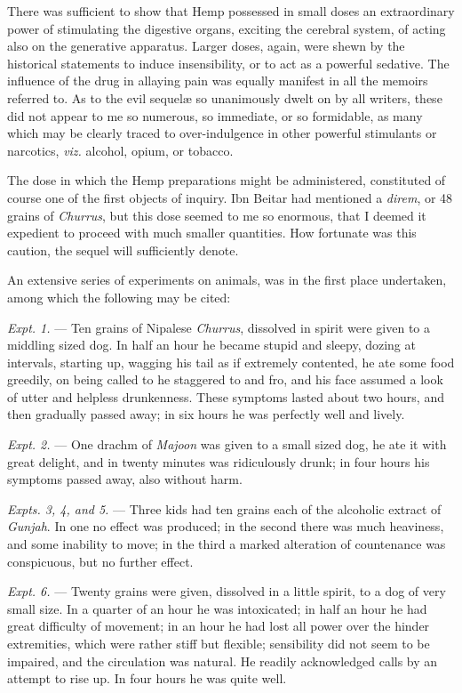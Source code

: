 \documentclass[a4paper, 11pt, oneside, polutonikogreek, english]{article}
\begin{document}
There was sufficient to show that Hemp possessed in small doses an extraordinary power of stimulating the digestive organs, exciting the cerebral system, of acting also on the generative apparatus. Larger doses, again, were shewn by the historical statements to induce insensibility, or to act as a powerful sedative. The influence of the drug in allaying pain was equally manifest in all the memoirs referred to. As to the evil sequelæ so unanimously dwelt on by all writers, these did not appear to me so numerous, so immediate, or so formidable, as many which may be clearly traced to over-indulgence in other powerful stimulants or narcotics, \emph{viz.} alcohol, opium, or tobacco.

The dose in which the Hemp preparations might be administered, constituted of course one of the first objects of inquiry. Ibn Beitar had mentioned a \emph{direm}, or 48 grains of \emph{Churrus}, but this dose seemed to me so enormous, that I deemed it expedient to proceed with much smaller quantities. How fortunate was this caution, the sequel will sufficiently denote.

An extensive series of experiments on animals, was in the first place undertaken, among which the following may be cited:

\emph{Expt. 1.} --- Ten grains of Nipalese \emph{Churrus}, dissolved in spirit were given to a middling sized dog. In half an hour he became stupid and sleepy, dozing at intervals, starting up, wagging his tail as if extremely contented, he ate some food greedily, on being called to he staggered to and fro, and his face assumed a look of utter and helpless drunkenness. These symptoms lasted about two hours, and then gradually passed away; in six hours he was perfectly well and lively.

\emph{Expt. 2.} --- One drachm of \emph{Majoon} was given to a small sized dog, he ate it with great delight, and in twenty minutes was ridiculously drunk; in four hours his symptoms passed away, also without harm.

\emph{Expts. 3, 4, and 5.} --- Three kids had ten grains each of the alcoholic extract of \emph{Gunjah}. In one no effect was produced; in the second there was much heaviness, and some inability to move; in the third a marked alteration of countenance was conspicuous, but no further effect.

\emph{Expt. 6.} --- Twenty grains were given, dissolved in a little spirit, to a dog of very small size. In a quarter of an hour he was intoxicated; in half an hour he had great difficulty of movement; in an hour he had lost all power over the hinder extremities, which were rather stiff but flexible; sensibility did not seem to be impaired, and the circulation was natural. He readily acknowledged calls by an attempt to rise up. In four hours he was quite well.
\end{document}
